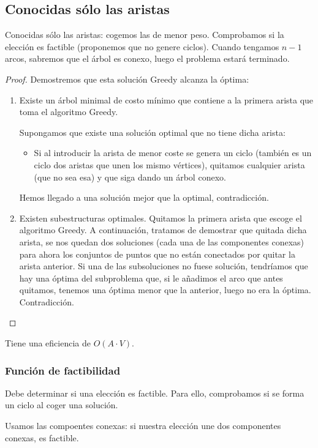 \subsection{Conocidas sólo las aristas}
Conocidas sólo las aristas: cogemos las de menor peso. Comprobamos si la elección es factible (proponemos que no genere ciclos).
Cuando tengamos $n-1$ arcos, sabremos que el árbol es conexo, luego el problema estará terminado.
\begin{proof}
    Demostremos que esta solución Greedy alcanza la óptima:
    \begin{enumerate}
        \item 
        Existe un árbol minimal de costo mínimo que contiene a la primera arista que toma el algoritmo Greedy.

        Supongamos que existe una solución optimal que no tiene dicha arista:
        \begin{itemize}
            \item Si al introducir la arista de menor coste se genera un ciclo (también es un ciclo dos aristas que unen los mismo vértices), quitamos cualquier arista (que no sea esa) y que siga dando un árbol conexo.
        \end{itemize}
        Hemos llegado a una solución mejor que la optimal, contradicción.

        \item Existen subestructuras optimales.
            Quitamos la primera arista que escoge el algoritmo Greedy. A continuación, tratamos de demostrar que quitada dicha arista, se nos quedan dos soluciones (cada una de las componentes conexas) para ahora los conjuntos de puntos que no están conectados por quitar la arista anterior.
            Si una de las subsoluciones no fuese solución, tendríamos que hay una óptima del subproblema que, si le añadimos el arco que antes quitamos, tenemos una óptima menor que la anterior, luego no era la óptima. Contradicción.
    \end{enumerate}
\end{proof}

Tiene una eficiencia de $O(A\cdot V)$.

\subsubsection{Función de factibilidad}
Debe determinar si una elección es factible. Para ello, comprobamos si se forma un ciclo al coger una solución.

Usamos las compoentes conexas: si nuestra elección une dos componentes conexas, es factible.

